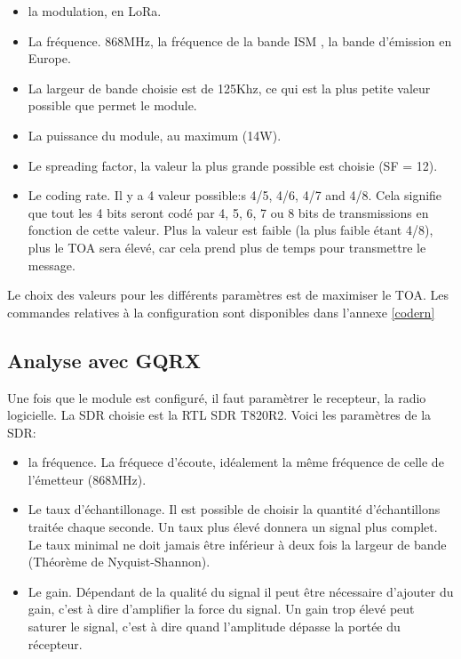 \begin{itemize}
\item la modulation, en LoRa.
\item La fréquence. 868MHz, la fréquence de la bande ISM , la bande d'émission en Europe.
\item La largeur de bande choisie est de 125Khz, ce qui est la plus petite valeur possible que permet le module.
\item La puissance du module, au maximum (14W).
\item Le spreading factor, la valeur la plus grande possible est choisie (SF = 12).
\item Le coding rate. Il y a 4 valeur possible:s 4/5, 4/6, 4/7 and 4/8. Cela signifie que tout les 4 bits seront codé par 4, 5, 6, 7 ou 8 bits de transmissions en fonction de cette valeur. Plus la valeur est faible (la plus faible étant 4/8), plus le TOA sera élevé, car cela prend plus de temps pour transmettre le message.
\end{itemize}

\vspace{0.1cm}

Le choix des valeurs pour les différents paramètres est de maximiser le TOA. Les commandes relatives à la configuration sont disponibles dans l'annexe \ref{codern}

\subsection{Analyse avec GQRX}

Une fois que le module est configuré, il faut paramètrer le recepteur, la radio logicielle. La SDR choisie est la RTL SDR T820R2. Voici les paramètres de la SDR:

\vspace{0.1cm}

\begin{itemize}
\item la fréquence. La fréquece d'écoute, idéalement la même fréquence de celle de l'émetteur (868MHz).
\item Le taux d'échantillonage. Il est possible de choisir la quantité d'échantillons traitée chaque seconde. Un taux plus élevé donnera un signal plus complet. Le taux minimal ne doit jamais être inférieur à deux fois la largeur de bande (Théorème de Nyquist-Shannon).
\item Le gain. Dépendant de la qualité du signal il peut être nécessaire d'ajouter du gain, c'est à dire d'amplifier la force du signal. Un gain trop élevé peut saturer le signal, c'est à dire quand l'amplitude dépasse la portée du récepteur.
\end{itemize}


